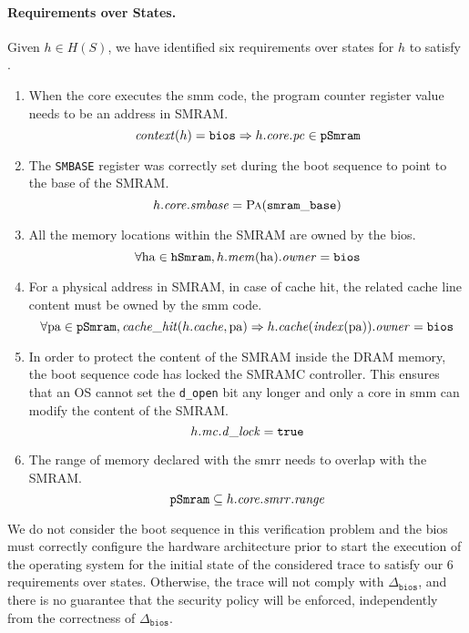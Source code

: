 \paragraph{Requirements over States.}
%
Given \( h \in H(S) \), we have identified six requirements over states for
\( h \) to satisfy .
%
\begin{enumerate}
\item When the core executes the \ac{smm} code, the program counter register
  value needs to be an address in SMRAM.
  \[
    \mathit{context}(h) = \mathtt{bios} \Rightarrow h.\mathit{core}.\mathit{pc} \in
    \texttt{pSmram}
  \]
\item The \texttt{SMBASE} register was correctly set during the boot sequence to
  point to the base of the SMRAM.
  \[
    h.\mathit{core}.\mathit{smbase} = \textsc{Pa}(\mathtt{smram\_base})
  \]
\item All the memory locations within the SMRAM are owned by the \ac{bios}.
  \[
    \forall \mathrm{ha} \in \texttt{hSmram}, h.\mathit{mem}(\mathrm{ha}).\mathit{owner} =
    \mathtt{bios}
  \]
\item For a physical address in SMRAM, in case of cache hit, the related cache
  line content must be owned by the \ac{smm} code.
  \[
    \forall \mathrm{pa} \in \texttt{pSmram}, \mathit{cache\_hit}(h.\mathit{cache},
    \mathrm{pa}) \Rightarrow h.\mathit{cache}(\mathit{index}(\mathrm{pa})).\mathit{owner} =
    \mathtt{bios}
  \]
\item In order to protect the content of the SMRAM inside the DRAM memory, the
  boot sequence code has locked the SMRAMC controller.
  This ensures that an OS cannot set the \texttt{d\_open} bit any longer and
  only a core in \ac{smm} can modify the content of the SMRAM.
  \[
    h.\mathit{mc}.\mathit{d\_lock} = \mathtt{true}
  \]
\item The range of memory declared with the \ac{smrr} needs to overlap with the
  SMRAM.
  \[
    \texttt{pSmram} \subseteq h.\mathit{core}.\mathit{smrr}.\mathit{range}
  \]
\end{enumerate}

We do not consider the boot sequence in this verification problem and the
\ac{bios} must correctly configure the hardware architecture prior to start the
execution of the operating system for the initial state of the considered trace
to satisfy our 6 requirements over states.
%
Otherwise, the trace will not comply with \( \Delta_{\mathtt{bios}} \), and
there is no guarantee that the security policy will be enforced, independently
from the correctness of \( \Delta_{\mathtt{bios}} \).

